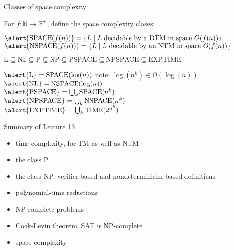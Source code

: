 \documentclass[handout]{beamer}
\begin{document}
\begin{frame}{Classes of space complexity}

    For $f: \mathbb{N}\to \mathbb{R}^+$, define the space complexity clases:

   
    $\alert{\mathrm{SPACE}(f(n))}=\{L\mid L \text{ decidable by a DTM in space }O(f(n))\}$\\ 
    $\alert{\mathrm{NSPACE}(f(n))}=\{L\mid L \text{ decidable by an NTM in space }O(f(n))\}$

    \medskip

    \begin{theorem}
        $\mathrm{L}\subseteq \mathrm{NL}\subseteq \mathrm{P} \subseteq \mathrm{NP} \subseteq \mathrm{PSPACE} \subseteq \mathrm{NPSPACE} \subseteq \mathrm{EXPTIME}$
    \end{theorem}
    
    $\alert{\mathrm{L}}=\mathrm{SPACE}(\log(n))$ \qquad note: $\log(n^k)\in O(\log(n))$\\
    $\alert{\mathrm{NL}}=\mathrm{NSPACE}(\log(n))$\\
    $\alert{\mathrm{PSPACE}} = \bigcup_k \mathrm{SPACE}(n^k)$\\
    $\alert{\mathrm{NPSPACE}} = \bigcup_k \mathrm{NSPACE}(n^k)$\\
    $\alert{\mathrm{EXPTIME}} = \bigcup_k \mathrm{TIME}(2^{n^k})$

\end{frame}


\begin{frame}{Summary of Lecture 13}

    \begin{itemize}
        \item time complexity, for TM as well as NTM
        \item the class P
        \item the class NP: verifier-based and nondeterminisim-based definitions
        \item polynomial-time reductions
        \item NP-complete problems
        \item Cook-Levin theorem: SAT is NP-complete
        \item space complexity
    \end{itemize}

\end{frame}
\end{document}
